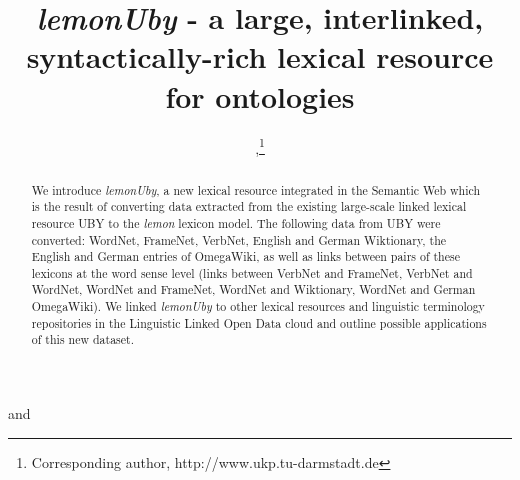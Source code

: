 \documentclass[sw]{iosart2c}
\begin{document}
\newcommand{\imgpath}{.}
\newcommand{\onto}[1]{\texttt{#1}}
\newcommand{\word}[1]{\textsl{#1}}

\begin{frontmatter}

\title{\emph{le\-mon\-U\-by} - a large, interlinked, syntactically-rich lexical resource for ontologies}


\author[A]{ ,\thanks{Corresponding author, http://www.ukp.tu-darmstadt.de}}
\author[B]{ }
and
\author[C]{ }
\address[A]{Ubiquitous Knowledge Processing (UKP) Lab,  Department of Computer Science,  Technische Universit{\"a}t Darmstadt
and Information Center for Education, German Institute for International Educational Research, Germany, 
http://www.ukp.tu-darmstadt.de}
\address[B]{Cognitive Interaction Technology (CITEC), Semantic Computing Group, Universit\"at Bielefeld, Germany, http://www.sc.cit-ec.uni-bielefeld.de}
\address[C]{Applied Computational Linguistics (ACoLi), Department of Computer Science and Mathematics, Goethe-University Frankfurt am Main, Germany, 
http://acoli.cs.uni-frankfurt.de}



\begin{abstract}
We introduce \emph{le\-mon\-U\-by}, a new lexical resource integrated in the Semantic Web
which is
 the result of converting data extracted from the existing large-scale linked lexical resource UBY to
 the \emph{lemon} lexicon model.
 The following data from UBY were converted: WordNet, FrameNet, VerbNet,
English and German Wiktionary, the English and German
entries of Ome\-ga\-Wi\-ki,
as well as links between pairs of these lexicons at the word sense level (links between VerbNet and FrameNet,
VerbNet and WordNet, WordNet and FrameNet, WordNet and Wiktionary, WordNet and German Ome\-ga\-Wiki).
We linked  \emph{le\-mon\-U\-by} to other lexical resources and linguistic
terminology repositories in the Linguistic Linked Open Data cloud and outline possible applications of this new dataset.


\end{abstract}
\end{frontmatter}
\end{document}
